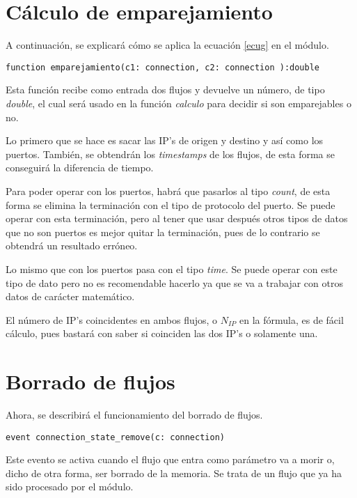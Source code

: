 \section{Cálculo de emparejamiento}

A continuación, se explicará cómo se aplica la ecuación \ref{ecug} en el módulo.

\begin{lstlisting}[style=CodigoC]
function emparejamiento(c1: connection, c2: connection ):double 
\end{lstlisting}

\intro Esta función recibe como entrada dos flujos y devuelve un número, de tipo \textit{double}, el cual será usado en la función \textit{calculo} para decidir si son emparejables o no.

\intro Lo primero que se hace es sacar las IP's de origen y destino y así como los puertos. También, se 
obtendrán los \textit{timestamps} de los flujos, de esta forma se conseguirá la diferencia de tiempo. 

\intro Para poder operar con los puertos, habrá que pasarlos al tipo \textit{count}, de esta forma se elimina la 
terminación con el tipo de protocolo del puerto. Se puede operar con esta terminación, pero al tener que usar después otros tipos de 
datos que no son puertos es mejor quitar la terminación, pues de lo contrario se obtendrá un resultado erróneo. 

\intro Lo mismo que con los puertos pasa con el tipo \textit{time}. Se puede operar con este tipo de dato pero no es recomendable 
hacerlo ya que se va a trabajar con otros datos de carácter matemático.

\intro El número de IP's coincidentes en ambos flujos, o \textit{$N_{IP}$} en la fórmula, es de fácil cálculo, pues bastará con saber 
si coinciden las dos IP's o solamente una.

\section{Borrado de flujos}

Ahora, se describirá el funcionamiento del borrado de flujos.

\begin{lstlisting}[style=CodigoC]
event connection_state_remove(c: connection)

\end{lstlisting}

\intro Este evento se activa cuando el flujo que entra como parámetro va a morir o, dicho de otra forma, ser borrado de la memoria. Se trata de un flujo que ya ha sido procesado por el módulo.

